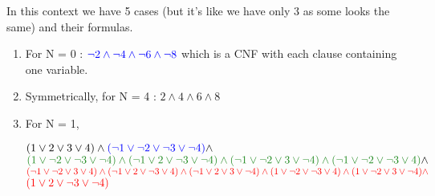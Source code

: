 \documentclass[a4paper]{article}
\begin{document}
\begin{enumerate}
In this context we have 5 cases (but it’s like we have only 3 as some looks the same) and their formulas.
\begin{enumerate}
\item For N = 0 :  \quad $ \textcolor{blue}{\neg2 \land \neg4 \land \neg6 \land \neg8} $ 
 which is a CNF with each clause containing one variable.
\newline
\item Symmetrically, for N = 4 : \quad $ 2 \land 4 \land 6 \land 8 $
\item For N = 1, \newline
\begin{center}
$ ( 1 \lor 2 \lor 3 \lor 4) \land \textcolor{blue}{( \neg 1 \lor \neg 2 \lor \neg 3 \lor \neg 4)}  \land $ \newline
$\textcolor{ForestGreen}{( 1 \lor \neg 2 \lor \neg 3 \lor \neg 4 ) \land  ( \neg 1 \lor 2 \lor \neg 3 \lor \neg 4 ) \land ( \neg 1 \lor \neg 2 \lor 3 \lor \neg 4 ) \land ( \neg 1 \lor \neg 2 \lor \neg 3 \lor 4 )} \land $ \newline
$\textcolor{red}{( \neg 1 \lor \neg 2 \lor 3 \lor 4) \land ( \neg 1 \lor 2 \lor \neg 3 \lor 4 ) \land ( \neg 1 \lor 2 \lor 3 \lor \neg 4 ) \land ( 1 \lor \neg 2 \lor \neg 3 \lor 4 ) \land ( 1 \lor \neg 2 \lor 3 \lor \neg 4 ) \land} $ \newline $\textcolor{red}{ ( 1 \lor 2 \lor \neg 3 \lor \neg 4 )} $
\end{center}


\end{enumerate}
\end{enumerate}
\end{document}
